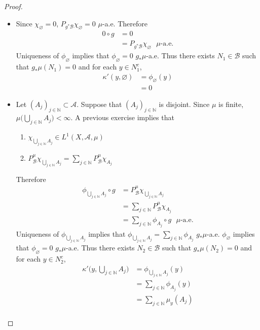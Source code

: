 \documentclass{book}
\theoremstyle{definition}
\newcommand{\kap}{\kappa}
\newcommand{\N}{\mathbb{N}}
\newcommand{\MA}{\mathcal{A}}
\newcommand{\MB}{\mathcal{B}}
\DeclareMathOperator*{\0}{\mbf{0}}
\DeclareMathOperator*{\1}{\mbf{1}}
\begin{document}
	\begin{proof}\
		\begin{itemize}
			\item Since $\chi_{\varnothing} = 0$, $P_{g^*\MB}\chi_{\varnothing} = 0$ $\mu$-a.e. Therefore
			\begin{align*}
				0 \circ g 
				& =  0 \\
				& = P_{g^*\MB}\chi_{\varnothing} \text{ $\mu$-a.e.}
			\end{align*}
			Uniqueness of $\phi_{\varnothing}$ implies that $\phi_{\varnothing} = 0$ $g_*\mu$-a.e. Thus there exists $N_1 \in \MB$ such that $g_*\mu(N_1) = 0$ and for each $y \in N_1^c$, 
			\begin{align*}
				\kap'(y, \varnothing) 
				& = \phi_{\varnothing}(y) \\
				& = 0
			\end{align*}
			\item Let $(A_j)_{j \in \N} \subset \MA$. Suppose that $(A_j)_{j \in \N}$ is disjoint. Since $\mu$ is finite, $\mu \bigg( \bigcup\limits_{j \in \N}A_j \bigg) < \infty$. A previous exercise implies that  
			\begin{enumerate}
				\item $\chi_{\bigcup\limits_{j \in \N} A_j} \in L^1(X, \MA, \mu)$
				\item $P^{\mu}_{\MB} \chi_{\bigcup\limits_{j \in \N} A_j} = \sum\limits_{j \in \N} P^{\mu}_{\MB}\chi_{A_j}$
			\end{enumerate}
			Therefore
			\begin{align*}
				\phi_{\bigcup\limits_{j \in \N} A_j} \circ g
				& = P^{\mu}_{\MB} \chi_{\bigcup\limits_{j \in \N} A_j} \\
				& = \sum\limits_{j \in \N} P^{\mu}_{\MB}\chi_{A_j} \\
				& = \sum\limits_{j \in \N} \phi_{A_j} \circ g \text{ $\mu$-a.e.}
			\end{align*}
			Uniqueness of $\phi_{\bigcup\limits_{j \in \N} A_j}$ implies that $\phi_{\bigcup\limits_{j \in \N} A_j} = \sum\limits_{j \in \N} \phi_{A_j}$ $g_*\mu$-a.e. $\phi_{\varnothing}$ implies that $\phi_{\varnothing} = 0$ $g_*\mu$-a.e. Thus there exists $N_2 \in \MB$ such that $g_*\mu(N_2) = 0$ and for each $y \in N_2^c$,
			\begin{align*}
				\kap' \bigg(y, \bigcup\limits_{j \in \N} A_j \bigg)
				& = \phi_{\bigcup\limits_{j \in \N} A_j}(y) \\
				& = \sum\limits_{j \in \N} \phi_{A_j}(y) \\
				& = \sum\limits_{j \in \N} \mu_y(A_j) \\

\end{align*}
\end{itemize}
\end{proof}
\end{document}
